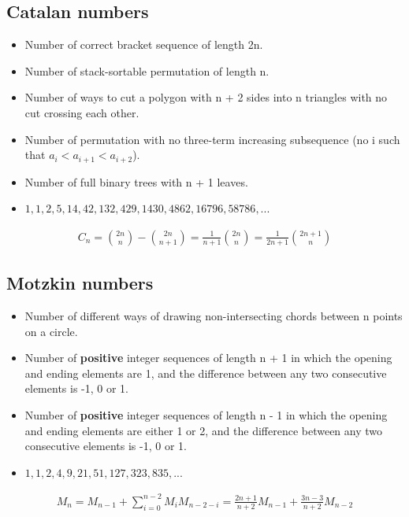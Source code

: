 \subsection{Catalan numbers}
\begin{itemize}
    \item Number of correct bracket sequence of length 2n.
    \item Number of stack-sortable permutation of length n.
    \item Number of ways to cut a polygon with n + 2 sides into n triangles with no cut crossing each other.
    \item Number of permutation with no three-term increasing subsequence (no i such that $a_i < a_{i + 1} < a_{i + 2}$).
    \item Number of full binary trees with n + 1 leaves.
    \item $1, 1, 2, 5, 14, 42, 132, 429, 1430, 4862, 16796, 58786, ...$
\end{itemize}
\begin{align*}
    C_n = \binom{2n}{n} - \binom{2n}{n+1} = \frac{1}{n+1} \binom{2n}{n} = \frac{1}{2n+1} \binom{2n+1}{n}
\end{align*}

\subsection{Motzkin numbers}
\begin{itemize}
    \item Number of different ways of drawing non-intersecting chords between n points on a circle.
    \item Number of \textbf{positive} integer sequences of length n + 1 in which the opening and ending elements are 1, and the difference between any two consecutive elements is -1, 0 or 1.
    \item Number of \textbf{positive} integer sequences of length n - 1 in which the opening and ending elements are either 1 or 2, and the difference between any two consecutive elements is -1, 0 or 1.
    \item $1, 1, 2, 4, 9, 21, 51, 127, 323, 835, ...$
\end{itemize}
\begin{align*}
    M_n = M_{n-1} + \sum_{i=0}^{n-2} M_i M_{n-2-i} = \frac{2n+1}{n+2} M_{n-1} + \frac{3n-3}{n+2} M_{n-2}
\end{align*}

